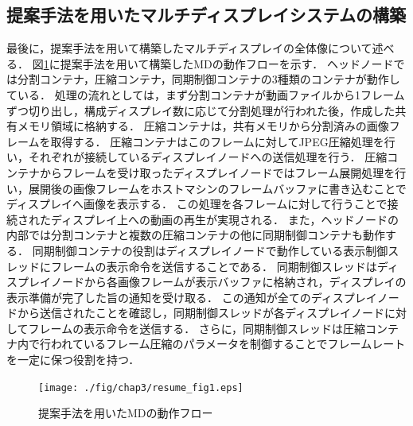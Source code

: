 \subsection*{提案手法を用いたマルチディスプレイシステムの構築}
最後に，提案手法を用いて構築したマルチディスプレイの全体像について述べる．
図\ref{system_flow_teian}に提案手法を用いて構築したMDの動作フローを示す．
ヘッドノードでは分割コンテナ，圧縮コンテナ，同期制御コンテナの3種類のコンテナが動作している．
処理の流れとしては，まず分割コンテナが動画ファイルから1フレームずつ切り出し，構成ディスプレイ数に応じて分割処理が行われた後，作成した共有メモリ領域に格納する．
圧縮コンテナは，共有メモリから分割済みの画像フレームを取得する．
圧縮コンテナはこのフレームに対してJPEG圧縮処理を行い，それぞれが接続しているディスプレイノードへの送信処理を行う．
圧縮コンテナからフレームを受け取ったディスプレイノードではフレーム展開処理を行い，展開後の画像フレームをホストマシンのフレームバッファに書き込むことでディスプレイへ画像を表示する．
この処理を各フレームに対して行うことで接続されたディスプレイ上への動画の再生が実現される．
また，ヘッドノードの内部では分割コンテナと複数の圧縮コンテナの他に同期制御コンテナも動作する．
同期制御コンテナの役割はディスプレイノードで動作している表示制御スレッドにフレームの表示命令を送信することである．
同期制御スレッドはディスプレイノードから各画像フレームが表示バッファに格納され，ディスプレイの表示準備が完了した旨の通知を受け取る．
この通知が全てのディスプレイノードから送信されたことを確認し，同期制御スレッドが各ディスプレイノードに対してフレームの表示命令を送信する．
さらに，同期制御スレッドは圧縮コンテナ内で行われているフレーム圧縮のパラメータを制御することでフレームレートを一定に保つ役割を持つ．


\begin{figure}[H]
    \hspace*{\fill}
    \texttt{[image: ./fig/chap3/resume\_fig1.eps]}
    \hspace*{\fill}
    \caption{提案手法を用いたMDの動作フロー}
    \label{system_flow_teian}
\end{figure}
